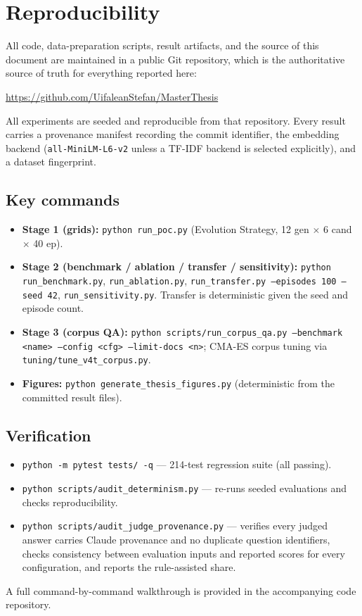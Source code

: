 \chapter{Reproducibility}
\label{app:repro}

All code, data-preparation scripts, result artifacts, and the source of this
document are maintained in a public Git repository, which is the authoritative
source of truth for everything reported here:
\begin{center}
\url{https://github.com/UifaleanStefan/MasterThesis}
\end{center}
All experiments are seeded and reproducible from that repository. Every result
carries a provenance manifest recording the commit identifier, the embedding
backend (\texttt{all-MiniLM-L6-v2} unless a TF-IDF backend is selected
explicitly), and a dataset fingerprint.

\section*{Key commands}
\begin{itemize}[leftmargin=1.4em]
  \item \textbf{Stage 1 (grids):} \texttt{python run\_poc.py} (Evolution
  Strategy, 12 gen $\times$ 6 cand $\times$ 40 ep).
  \item \textbf{Stage 2 (benchmark / ablation / transfer / sensitivity):}
  \texttt{python run\_benchmark.py}, \texttt{run\_ablation.py},
  \texttt{run\_transfer.py --episodes 100 --seed 42}, \texttt{run\_sensitivity.py}.
  Transfer is deterministic given the seed and episode count.
  \item \textbf{Stage 3 (corpus QA):} \texttt{python scripts/run\_corpus\_qa.py
  --benchmark <name> --config <cfg> --limit-docs <n>}; CMA-ES corpus tuning via
  \texttt{tuning/tune\_v4t\_corpus.py}.
  \item \textbf{Figures:} \texttt{python generate\_thesis\_figures.py}
  (deterministic from the committed result files).
\end{itemize}

\section*{Verification}
\begin{itemize}[leftmargin=1.4em]
  \item \texttt{python -m pytest tests/ -q} --- 214-test regression suite (all
  passing).
  \item \texttt{python scripts/audit\_determinism.py} --- re-runs seeded
  evaluations and checks reproducibility.
  \item \texttt{python scripts/audit\_judge\_provenance.py} --- verifies every
  judged answer carries Claude provenance and no duplicate question identifiers,
  checks consistency between evaluation inputs and reported scores for every
  configuration, and reports the rule-assisted share.
\end{itemize}
A full command-by-command walkthrough is provided in the accompanying code
repository.
